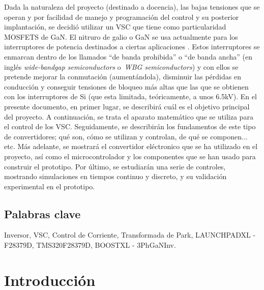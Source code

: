 \documentclass{report}
\begin{document}
Dada la naturaleza del proyecto (destinado a docencia), las bajas tensiones que se operan y por facilidad de manejo y programación del control y su posterior implantación, se decidió utilizar un VSC que tiene como particularidad MOSFETS de GaN. El nitruro de galio o GaN se usa actualmente \cite{siete} para los interruptores de potencia destinados a ciertas aplicaciones \cite{veinticuatro}. Estos interruptores se enmarcan dentro de los llamados ``de banda prohibida'' o ``de banda ancha'' (en inglés \textit{wide-bandgap semiconductors} o \textit{WBG semiconductors}) y con ellos se pretende mejorar la conmutación (aumentándola), disminuir las pérdidas en conducción y conseguir tensiones de bloqueo más altas que las que se obtienen con los interruptores de Si (que esta limitada, teóricamente, a unos 6.5kV)\cite{cinco}.
En el presente documento, en primer lugar, se describirá cuál es el objetivo principal del proyecto. A continuación, se trata el aparato matemático que se utiliza para el control de los VSC. Seguidamente, se describirán los fundamentos de este tipo de convertidores; qué son, cómo se utilizan y controlan, de qué se componen... etc. Más adelante, se mostrará el convertidor eléctronico que se ha utilizado en el proyecto, así como el microcontrolador y los componentes que se han usado para construir el prototipo. Por último, se estudiarán una serie de controles, mostrando simulaciones en tiempos continuo y discreto, y su validación experimental en el prototipo.



\section*{Palabras clave} \label{sec.palabrasclave}
Inversor, VSC, Control de Corriente, Transformada de Park, LAUNCHPADXL - F28379D, TMS320F28379D, BOOSTXL - 3PhGaNInv.

\newpage

\tableofcontents
\listoffigures

\newpage
{} %
\setcounter{page}{1}
\chapter{Introducción} \label{sec.introduccion}

\end{document}
